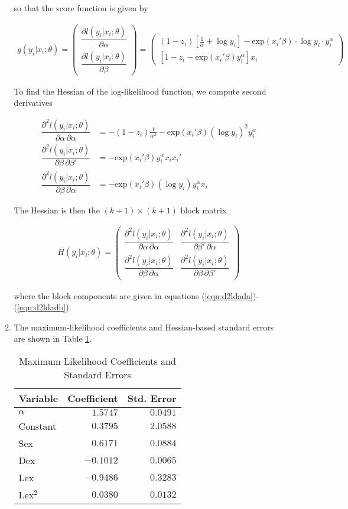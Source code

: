 \documentclass[]{report}
\newcommand{\0}{\bv{0}}
\newcommand{\1}{\bv{1}}
\newcommand{\twovec}[2]{\parens{\begin{array}{c} #1 \\ #2 \end{array}}}
\newcommand{\twobytwomat}[4]{\parens{\begin{array}{cc} #1 & #2 \\ #3 & #4 \end{array}}}
\newcommand{\parens}[1]{\left(#1\right)}
\renewcommand{\exp}[1]{\mathrm{exp}\parens{#1}}
\newcommand{\oneover}[1]{\frac{1}{#1}}
\newcommand{\partialdtwo}[3]{ \dfrac{\partial^2 #1}{\partial #2 \, \partial #3}}
\begin{document}
\begin{enumerate}[1.]
\begin{enumerate}
so that the score function is given by

\begin{align}
	g(y_i | x_i ; \theta) = \twovec{\dfrac{\partial l(y_i | x_i ; \theta)}{\partial \alpha}}{\dfrac{\partial l(y_i | x_i ; \theta)}{\partial \beta}} = \twovec{(1 - z_i) \left[ \oneover{\alpha} + \log y_i \right] - \exp{x_i' \beta} \cdot \log{y_i} \cdot y_i^\alpha}{\left[ 1 - z_i - \exp{x_i' \beta} y_i^\alpha \right] x_i}
\end{align}

To find the Hessian of the log-likelihood function, we compute second derivatives


\begin{align}
  \partialdtwo{ l(y_i | x_i ; \theta)}{\alpha}{\alpha} &= - (1-z_i) \oneover{\alpha^2} - \exp{x_i' \beta} (\log y_i)^2 y_i^\alpha \label{eqn:d2ldada}\\
 \partialdtwo{ l(y_i | x_i ; \theta)}{\beta}{\beta'} &= -\exp{x_i' \beta} y_i^\alpha x_i x_i'\\
  \partialdtwo{ l(y_i | x_i ; \theta)}{\beta}{\alpha} &= - \exp{x_i' \beta} (\log y_i) y_i^\alpha x_i \label{eqn:d2ldadb}
\end{align}

The Hessian is then the $(k+1) \times (k+1)$ block matrix 

\begin{align}
	H(y_i|x_i; \theta) = \twobytwomat{\partialdtwo{ l(y_i | x_i ; \theta)}{\alpha}{\alpha}}{\partialdtwo{ l(y_i | x_i ; \theta)}{\beta'}{\alpha}}{\partialdtwo{ l(y_i | x_i ; \theta)}{\beta}{\alpha}}{\partialdtwo{ l(y_i | x_i ; \theta)}{\beta}{\beta'}}
\end{align}

where the block components are given in equations (\ref{eqn:d2ldada})-(\ref{eqn:d2ldadb}).

\item
The maximum-likelihood coefficients and Hessian-based standard errors are shown in Table \ref{tbl:MLE_estimates}.


\begin{table}[htbp]
	\caption{Maximum Likelihood Coefficients and Standard Errors}
	\label{tbl:MLE_estimates}
	\begin{center}
		\begin{tabular}{lrr}
			Variable&Coefficient&Std. Error\\
			\hline
			$\alpha$&$1.5747$&$0.0491$\\
			Constant&$0.3795$&$2.0588$\\
			Sex&$0.6171$&$0.0884$\\
			Dex&$-0.1012$&$0.0065$\\
			Lex&$-0.9486$&$0.3283$\\
			Lex$^2$&$0.0380$&$0.0132$\\
		\end{tabular}
	\end{center}
\end{table}



\end{enumerate}
\end{enumerate}
\end{document}

